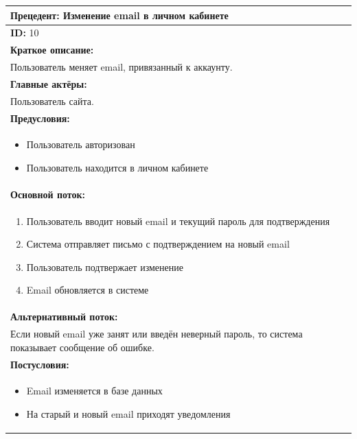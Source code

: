 \documentclass{scrreprt}
\begin{document}
\vspace{10px}
\noindent
\begin{tabularx}{\textwidth}{|X|}
	\hline
	\textbf{Прецедент: Изменение email в личном кабинете} \\
	\hline
	\textbf{ID:} 10 \\
	\hline
	\textbf{Краткое описание:} \\
	Пользователь меняет email, привязанный к аккаунту.\\
	\hline
	\textbf{Главные актёры:} \\
	Пользователь сайта. \\
	\hline
	\textbf{Предусловия:} \\
	\begin{itemize}[nosep,leftmargin=*]
		\item Пользователь авторизован 
		\item Пользователь находится в личном кабинете
	\end{itemize} \\
	\hline
	\textbf{Основной поток:} \\
	\begin{enumerate}[nosep,leftmargin=*]
		\item Пользователь вводит новый email и текущий пароль для подтверждения
		\item Система отправляет письмо с подтверждением на новый email
		\item Пользователь подтвержает изменение
		\item Email обновляется в системе 
	\end{enumerate} \\
	\hline
	\textbf{Альтернативный поток:} \\
	Если новый email уже занят или введён неверный пароль, то система показывает сообщение об ошибке.\\
	\hline
	\textbf{Постусловия:} \\
	\begin{itemize}[nosep,leftmargin=*]
		\item Email изменяется в базе данных
		\item На старый и новый email приходят уведомления
	\end{itemize} \\
	\hline
\end{tabularx}
\end{document}
